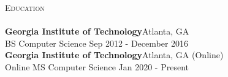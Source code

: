 \documentclass[a4paper]{article}
\newcommand{\lineunder} {
    \vspace*{-8pt} \\
    \hspace*{-18pt} \hrulefill \\
}
\newcommand{\header} [1] {
    {\hspace*{-18pt}\vspace*{6pt} \textsc{#1}}
    \vspace*{-6pt} \lineunder
}
\begin{document}
\header{Education}
\textbf{Georgia Institute of Technology}\hfill Atlanta, GA\\
BS Computer Science \hfill Sep 2012 - December 2016\\
\vspace{2mm}
\textbf{Georgia Institute of Technology}\hfill Atlanta, GA (Online)\\
Online MS Computer Science \hfill Jan 2020 - Present\\
\vspace{2mm}



\ 
\end{document}

